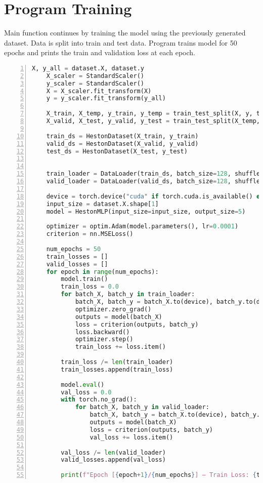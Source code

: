 \documentclass{article}
\begin{document}
\section{Program Training}
Main function continues by training the model using the previously generated dataset. Data is split into train and test data. Program trains model for 50 epochs and prints the train and validation loss at each epoch.
\lstset{firstnumber=last}
\begin{lstlisting}[language=Python, caption={Train Model}, label={lst:imports}, numbers=left]
X, y_all = dataset.X, dataset.y
    X_scaler = StandardScaler()
    y_scaler = StandardScaler()
    X = X_scaler.fit_transform(X)
    y = y_scaler.fit_transform(y_all)

    X_train, X_temp, y_train, y_temp = train_test_split(X, y, test_size=0.2, random_state=42)
    X_valid, X_test, y_valid, y_test = train_test_split(X_temp, y_temp, test_size=0.5, random_state=42)

    train_ds = HestonDataset(X_train, y_train)
    valid_ds = HestonDataset(X_valid, y_valid)
    test_ds = HestonDataset(X_test, y_test)


    train_loader = DataLoader(train_ds, batch_size=128, shuffle=True)
    valid_loader = DataLoader(valid_ds, batch_size=128, shuffle=False)

    device = torch.device("cuda" if torch.cuda.is_available() else "cpu")
    input_size = dataset.X.shape[1]
    model = HestonMLP(input_size=input_size, output_size=5)

    optimizer = optim.Adam(model.parameters(), lr=0.0001)
    criterion = nn.MSELoss()

    num_epochs = 50
    train_losses = []
    valid_losses = []
    for epoch in range(num_epochs):
        model.train()
        train_loss = 0.0
        for batch_X, batch_y in train_loader:
            batch_X, batch_y = batch_X.to(device), batch_y.to(device)
            optimizer.zero_grad()
            outputs = model(batch_X)
            loss = criterion(outputs, batch_y)
            loss.backward()
            optimizer.step()
            train_loss += loss.item()

        train_loss /= len(train_loader)
        train_losses.append(train_loss)

        model.eval()
        val_loss = 0.0
        with torch.no_grad():
            for batch_X, batch_y in valid_loader:
                batch_X, batch_y = batch_X.to(device), batch_y.to(device)
                outputs = model(batch_X)
                loss = criterion(outputs, batch_y)
                val_loss += loss.item()

        val_loss /= len(valid_loader)
        valid_losses.append(val_loss)

        print(f"Epoch [{epoch+1}/{num_epochs}] – Train Loss: {train_loss:.6f}, Val Loss: {val_loss:.6f}")
\end{lstlisting}
\end{document}

